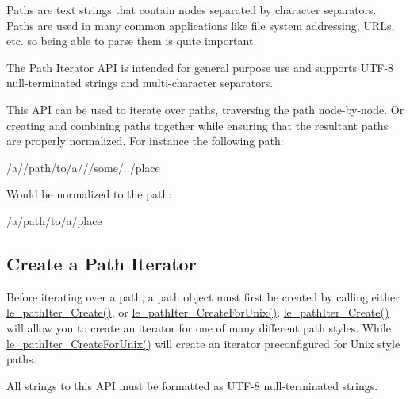 Paths are text strings that contain nodes separated by character separators. Paths are used in many common applications like file system addressing, U\+R\+Ls, etc. so being able to parse them is quite important.

The Path Iterator A\+P\+I is intended for general purpose use and supports U\+T\+F-\/8 null-\/terminated strings and multi-\/character separators.

This A\+P\+I can be used to iterate over paths, traversing the path node-\/by-\/node. Or creating and combining paths together while ensuring that the resultant paths are properly normalized. For instance the following path\+:

\begin{DoxyVerb} /a//path/to/a///some/../place
\end{DoxyVerb}


Would be normalized to the path\+:

\begin{DoxyVerb} /a/path/to/a/place
\end{DoxyVerb}
\hypertarget{c_path_iter_c_pathIter_create}{}\subsection{Create a Path Iterator}\label{c_path_iter_c_pathIter_create}
Before iterating over a path, a path object must first be created by calling either {\ttfamily \hyperlink{le__path_iter_8h_a73fac1b657b752b17395c66fb1ae324b}{le\+\_\+path\+Iter\+\_\+\+Create()}}, or {\ttfamily \hyperlink{le__path_iter_8h_a35a38b307f9fdc0de82552e96a5a2d1d}{le\+\_\+path\+Iter\+\_\+\+Create\+For\+Unix()}}. {\ttfamily \hyperlink{le__path_iter_8h_a73fac1b657b752b17395c66fb1ae324b}{le\+\_\+path\+Iter\+\_\+\+Create()}} will allow you to create an iterator for one of many different path styles. While {\ttfamily \hyperlink{le__path_iter_8h_a35a38b307f9fdc0de82552e96a5a2d1d}{le\+\_\+path\+Iter\+\_\+\+Create\+For\+Unix()}} will create an iterator preconfigured for Unix style paths.

All strings to this A\+P\+I must be formatted as U\+T\+F-\/8 null-\/terminated strings.

